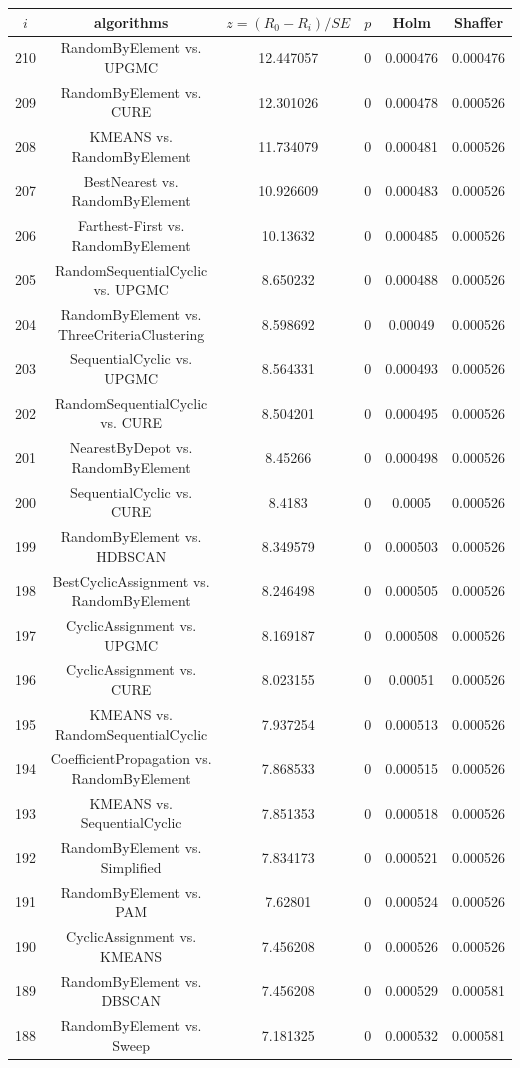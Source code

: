 \documentclass[a4paper,10pt]{article}
\begin{document}
\begin{landscape}
\begin{table}[!htp]
\centering\scriptsize
\begin{tabular}{cccccc}
$i$&algorithms&$z=(R_0 - R_i)/SE$&$p$&Holm&Shaffer\\
\hline210&RandomByElement vs. UPGMC&12.447057&0&0.000476&0.000476\\
209&RandomByElement vs. CURE&12.301026&0&0.000478&0.000526\\
208&KMEANS vs. RandomByElement&11.734079&0&0.000481&0.000526\\
207&BestNearest vs. RandomByElement&10.926609&0&0.000483&0.000526\\
206&Farthest-First vs. RandomByElement&10.13632&0&0.000485&0.000526\\
205&RandomSequentialCyclic vs. UPGMC&8.650232&0&0.000488&0.000526\\
204&RandomByElement vs. ThreeCriteriaClustering&8.598692&0&0.00049&0.000526\\
203&SequentialCyclic vs. UPGMC&8.564331&0&0.000493&0.000526\\
202&RandomSequentialCyclic vs. CURE&8.504201&0&0.000495&0.000526\\
201&NearestByDepot vs. RandomByElement&8.45266&0&0.000498&0.000526\\
200&SequentialCyclic vs. CURE&8.4183&0&0.0005&0.000526\\
199&RandomByElement vs. HDBSCAN&8.349579&0&0.000503&0.000526\\
198&BestCyclicAssignment vs. RandomByElement&8.246498&0&0.000505&0.000526\\
197&CyclicAssignment vs. UPGMC&8.169187&0&0.000508&0.000526\\
196&CyclicAssignment vs. CURE&8.023155&0&0.00051&0.000526\\
195&KMEANS vs. RandomSequentialCyclic&7.937254&0&0.000513&0.000526\\
194&CoefficientPropagation vs. RandomByElement&7.868533&0&0.000515&0.000526\\
193&KMEANS vs. SequentialCyclic&7.851353&0&0.000518&0.000526\\
192&RandomByElement vs. Simplified&7.834173&0&0.000521&0.000526\\
191&RandomByElement vs. PAM&7.62801&0&0.000524&0.000526\\
190&CyclicAssignment vs. KMEANS&7.456208&0&0.000526&0.000526\\
189&RandomByElement vs. DBSCAN&7.456208&0&0.000529&0.000581\\
188&RandomByElement vs. Sweep&7.181325&0&0.000532&0.000581\\

\end{tabular}
\end{table}
\end{landscape}
\end{document}
